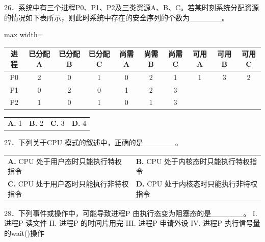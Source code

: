 \documentclass[UTF8,11pt]{ctexart}
\begin{document}
26．系统中有三个进程P0、P1、P2及三类资源A、B、C。若某时刻系统分配资源的情况如下表所示，则此时系统中存在的安全序列的个数为\_\_\_\_\_\_。


\begin{center}\begin{adjustbox}{max width=\linewidth}\begin{tabular}{|c|c|c|c|c|c|c|c|c|c|}\hline
进程 & 已分配A & 已分配B & 已分配C & 尚需A & 尚需B & 尚需C & 可用A & 可用B & 可用C\\\hline
P0 & 2 & 0 & 1 & 0 & 2 & 1 & 1 & 3 & 2\\\hline
P1 & 0 & 2 & 0 & 1 & 2 & 3 &  &  & \\\hline
P2 & 1 & 0 & 1 & 0 & 1 & 3 &  &  & \\\hline\end{tabular}\end{adjustbox}\end{center}

\begin{center}\begin{tabular}{>{\raggedright\arraybackslash}p{\dimexpr(\linewidth-8\tabcolsep)/4\relax}>{\raggedright\arraybackslash}p{\dimexpr(\linewidth-8\tabcolsep)/4\relax}>{\raggedright\arraybackslash}p{\dimexpr(\linewidth-8\tabcolsep)/4\relax}>{\raggedright\arraybackslash}p{\dimexpr(\linewidth-8\tabcolsep)/4\relax}}
\textbf{A.} 1 & \textbf{B.} 2 & \textbf{C.} 3 & \textbf{D.} 4\\[.35em]\end{tabular}\end{center}

27．下列关于CPU 模式的叙述中，正确的是\_\_\_\_\_\_。


\begin{center}\begin{tabular}{>{\raggedright\arraybackslash}p{\dimexpr(\linewidth-4\tabcolsep)/2\relax}>{\raggedright\arraybackslash}p{\dimexpr(\linewidth-4\tabcolsep)/2\relax}}
\textbf{A.} CPU 处于用户态时只能执行特权指令 & \textbf{B.} CPU 处于内核态时只能执行特权指令\\[.35em]
\textbf{C.} CPU 处于用户态时只能执行非特权指令 & \textbf{D.} CPU 处于内核态时只能执行非特权指令\\[.35em]\end{tabular}\end{center}

28．下列事件或操作中，可能导致进程P 由执行态变为阻塞态的是\_\_\_\_\_\_。 I. 进程P 读文件 II. 进程P 的时间片用完 III. 进程P 申请外设 IV. 进程P 执行信号量的wait()操作
\end{document}
